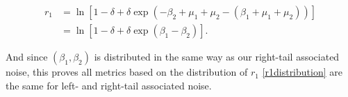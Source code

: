 \documentclass[letterpaper,11pt]{article}
\begin{document}
\begin{align}
r_1 &= \ln[1-\delta+\delta \exp(-\beta_2+\mu_1+\mu_2-(\beta_1+\mu_1+\mu_2))]\\
&= \ln[1-\delta+\delta \exp(\beta_1-\beta_2)].
\end{align}

\noindent And since $(\beta_1, \beta_2)$ is distributed in the same way as our right-tail associated noise, this proves all metrics based on the distribution of $r_1$ \ref{r1distribution} are the same for left- and right-tail associated noise.
\end{document}
